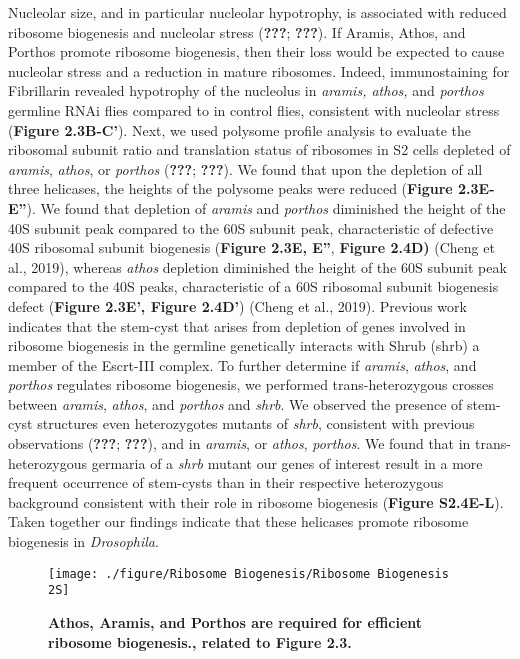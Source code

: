 \documentclass[12pt,oneside]{reedthesis}
\begin{document}
Nucleolar size, and in particular nucleolar hypotrophy, is associated with reduced ribosome biogenesis and nucleolar stress ({\textbf{???}}; {\textbf{???}}). If Aramis, Athos, and Porthos promote ribosome biogenesis, then their loss would be expected to cause nucleolar stress and a reduction in mature ribosomes. Indeed, immunostaining for Fibrillarin revealed hypotrophy of the nucleolus in \emph{aramis, athos,} and \emph{porthos} germline RNAi flies compared to in control flies, consistent with nucleolar stress (\textbf{Figure 2.3B-C'}). Next, we used polysome profile analysis to evaluate the ribosomal subunit ratio and translation status of ribosomes in S2 cells depleted of \emph{aramis}, \emph{athos}, or \emph{porthos} ({\textbf{???}}; {\textbf{???}}). We found that upon the depletion of all three helicases, the heights of the polysome peaks were reduced (\textbf{Figure 2.3E-E''}). We found that depletion of \emph{aramis} and \emph{porthos} diminished the height of the 40S subunit peak compared to the 60S subunit peak, characteristic of defective 40S ribosomal subunit biogenesis (\textbf{Figure 2.3E, E''}, \textbf{Figure 2.4D)} (Cheng et al., 2019), whereas \emph{athos} depletion diminished the height of the 60S subunit peak compared to the 40S peaks, characteristic of a 60S ribosomal subunit biogenesis defect (\textbf{Figure 2.3E', Figure 2.4D'}) (Cheng et al., 2019). Previous work indicates that the stem-cyst that arises from depletion of genes involved in ribosome biogenesis in the germline genetically interacts with Shrub (shrb) a member of the Escrt-III complex. To further determine if \emph{aramis}, \emph{athos}, and \emph{porthos} regulates ribosome biogenesis, we performed trans-heterozygous crosses between \emph{aramis}, \emph{athos}, and \emph{porthos} and \emph{shrb}. We observed the presence of stem-cyst structures even heterozygotes mutants of \emph{shrb}, consistent with previous observations ({\textbf{???}}; {\textbf{???}}), and in \emph{aramis}, or \emph{athos}, \emph{porthos}. We found that in trans-heterozygous germaria of a \emph{shrb} mutant our genes of interest result in a more frequent occurrence of stem-cysts than in their respective heterozygous background consistent with their role in ribosome biogenesis (\textbf{Figure S2.4E-L}). Taken together our findings indicate that these helicases promote ribosome biogenesis in \emph{Drosophila}.
\begin{figure}

{\centering \texttt{[image: ./figure/Ribosome Biogenesis/Ribosome Biogenesis 2S]} 

}

\caption[\textbf{Athos, Aramis, and Porthos are required for efficient ribosome biogenesis., related to Figure 2.3.}]{\textbf{Athos, Aramis, and Porthos are required for efficient ribosome biogenesis., related to Figure 2.3.}}\label{fig:unnamed-chunk-9}
\end{figure}
\end{document}
